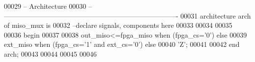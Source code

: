 \begin{DoxyCode}
00029 \textcolor{keyword}{-- Architecture}
00030 \textcolor{keyword}{-- ----------------------------------------------------------------------------}
00031 \textcolor{keywordflow}{architecture} arch \textcolor{keywordflow}{of} miso_mux is
00032 \textcolor{keyword}{--declare signals,  components here}
00033 
00034 
00035   
00036 \textcolor{vhdlkeyword}{begin}
00037 
00038 \textcolor{vhdlchar}{out_miso}\textcolor{vhdlchar}{<=}\textcolor{vhdlchar}{fpga_miso} \textcolor{keywordflow}{when} \textcolor{vhdlchar}{(}\textcolor{vhdlchar}{fpga_cs}\textcolor{vhdlchar}{=}\textcolor{vhdlchar}{'}\textcolor{vhdllogic}{}\textcolor{vhdllogic}{0}\textcolor{vhdlchar}{'}\textcolor{vhdlchar}{)} \textcolor{keywordflow}{else} 
00039                 \textcolor{vhdlchar}{ext_miso} \textcolor{keywordflow}{when} \textcolor{vhdlchar}{(}\textcolor{vhdlchar}{fpga_cs}\textcolor{vhdlchar}{=}\textcolor{vhdlchar}{'}\textcolor{vhdllogic}{}\textcolor{vhdllogic}{1}\textcolor{vhdlchar}{'} \textcolor{keywordflow}{and} \textcolor{vhdlchar}{ext_cs}\textcolor{vhdlchar}{=}\textcolor{vhdlchar}{'}\textcolor{vhdllogic}{}\textcolor{vhdllogic}{0}\textcolor{vhdlchar}{'}\textcolor{vhdlchar}{)} \textcolor{keywordflow}{else}
00040                 \textcolor{vhdlchar}{'}\textcolor{vhdlchar}{Z}\textcolor{vhdlchar}{'};
00041   
00042 \textcolor{keywordflow}{end} \textcolor{vhdlchar}{arch};   
00043 
00044 
00045 
00046 
\end{DoxyCode}
